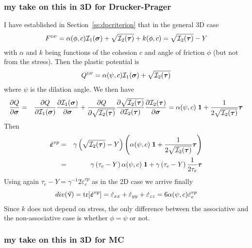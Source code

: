 \subsubsection{my take on this in 3D for Drucker-Prager}


I have established in Section~\ref{ss:dpcriterion} that in the general 3D case
\begin{equation}
F^{\text{\tiny DP}}= \alpha(\phi,c) {\cal I}_1({\bm \sigma}) + \sqrt{ {\cal I}_2({\bm \tau})  } + k(\phi,c) 
=\sqrt{  {\cal I}_2({\bm \tau})  } -Y 
\end{equation}
with $\alpha$ and $k$ being functions of the cohesion $c$ and angle of friction $\phi$ 
(but not from the stress). Then the plastic potential is
\begin{equation}
Q^{\text{\tiny DP}}= \alpha(\psi,c) {\cal I}_1({\bm \sigma})   +  \sqrt{  {\cal I}_2({\bm \tau})  } 
\end{equation}
where $\psi$ is the dilation angle.
We then have
\begin{eqnarray}
\frac{\partial Q}{\partial \bm\sigma} 
&=&
\frac{\partial Q}{\partial {\cal I}_1(\bm\sigma)} 
\frac{\partial {\cal I}_1(\bm\sigma)}{\partial \bm\sigma} 
+
\frac{\partial Q}{\partial \sqrt{{\cal I}_2(\bm\tau)}} 
\frac{\partial \sqrt{ {\cal I}_2(\bm\tau)}   }{\partial {\cal I}_2(\bm\tau)} 
\frac{\partial {\cal I}_2(\bm\tau)}{\partial \bm\sigma} 
=
\alpha(\psi,c) \; {\bm 1} + \frac{1}{2 \sqrt{ {\cal I}_2(\bm\tau)}} 
\bm\tau
\end{eqnarray}
Then 
\begin{eqnarray}
\dot{\bm \varepsilon}^{vp} 
&=& \gamma \left(\sqrt{{\cal I}_2(\bm\tau)} - Y \right)
\left(\alpha(\psi,c) \;  {\bm 1} + \frac{1}{2 \sqrt{{\cal I}_2(\bm \tau)}} {\bm \tau} \right) \nonumber\\
&=& \gamma \left(\tau_e - Y \right)
\alpha(\psi,c) \;  {\bm 1} 
+  
\gamma \left(\tau_e - Y \right)
\frac{1}{2 \tau_e} {\bm \tau}  
\end{eqnarray}
Using again $\tau_e - Y = \gamma^{-1} 2  \dot\varepsilon_e^{vp}$ as in the 2D case 
we arrive finally
\[
div (\vec\upnu)=
{\rm tr}[\dot{\bm \varepsilon}^{vp}]=
\dot{\varepsilon}_{xx}
+
\dot{\varepsilon}_{yy}
+
\dot{\varepsilon}_{zz}
=
6 \alpha(\psi,c) \dot\varepsilon_e^{vp}
\]
Since $k$ does not depend on stress, the only difference between the associative
and the non-associative case is whether $\phi=\psi$ or not.

\subsubsection{my take on this in 3D for MC}

